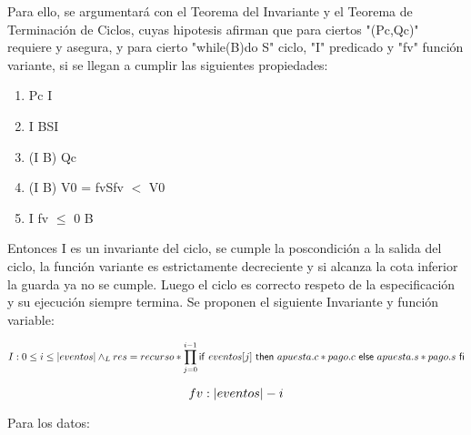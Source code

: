 \documentclass[10pt,a4paper]{article}
\begin{document}
 Para ello, se argumentará con el Teorema del Invariante y el Teorema de Terminación de Ciclos, cuyas hipotesis afirman que
 para ciertos "(Pc,Qc)" requiere y asegura, y para cierto "while(B)do S" ciclo, "I" predicado y "fv" función variante,
 si se llegan a cumplir las siguientes propiedades:

\begin{enumerate} \setlength\itemsep{1cm}
	\item Pc \implica I

	\item {I \land B}S{I}

	\item (I \land \neg B) \implica Qc %

	\item {(I \land B) \land V0 = fv}S{fv $<$ V0}

	\item I \land fv $\leq$ 0 \implica \neg B
\end{enumerate}

 Entonces I es un invariante del ciclo, se cumple la poscondición a la salida del ciclo,
 la función variante es estrictamente decreciente y si alcanza la cota inferior la guarda ya no se cumple.
 Luego el ciclo es correcto respeto de la especificación y su ejecución siempre termina.
 Se proponen el siguiente Invariante y función variable:

\begin{equation}
	I: 0 \leq i \leq |eventos| \land _L res = recurso * \prod\limits_{j=0}^{i-1} \mathsf{if}\ eventos[j]\ \mathsf{then}\ apuesta.c * pago.c\ \mathsf{else}\ apuesta.s * pago.s\ \mathsf{fi}
\end{equation}

\begin{equation}
	fv: |eventos| - i
\end{equation}

 Para los datos:

\end{document}
